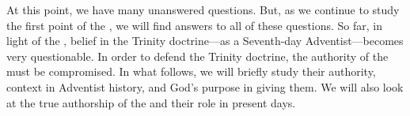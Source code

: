 At this point, we have many unanswered questions. But, as we continue to study the first point of the , we will find answers to all of these questions. So far, in light of the , belief in the Trinity doctrine—as a Seventh-day Adventist—becomes very questionable. In order to defend the Trinity doctrine, the authority of the  must be compromised. In what follows, we will briefly study their authority, context in Adventist history, and God’s purpose in giving them. We will also look at the true authorship of the  and their role in present days.